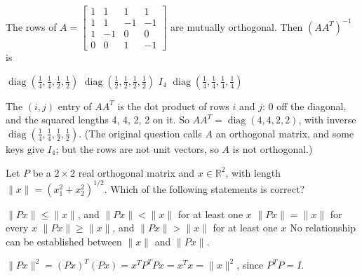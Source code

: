 \begin{question}[id=gate-ec2005-2, source=GATE EC 2005 (adapted), marks=2]
The rows of $A = \begin{bmatrix} 1 & 1 & 1 & 1 \\ 1 & 1 & -1 & -1 \\ 1 & -1 & 0 & 0 \\ 0 & 0 & 1 & -1 \end{bmatrix}$ are mutually orthogonal. Then $(AA^T)^{-1}$ is
\begin{options}
  \correct $\operatorname{diag}\left(\frac{1}{4}, \frac{1}{4}, \frac{1}{2}, \frac{1}{2}\right)$
  \option $\operatorname{diag}\left(\frac{1}{2}, \frac{1}{2}, \frac{1}{2}, \frac{1}{2}\right)$
  \option $I_4$
  \option $\operatorname{diag}\left(\frac{1}{4}, \frac{1}{4}, \frac{1}{4}, \frac{1}{4}\right)$
\end{options}
\begin{solution}
The $(i, j)$ entry of $AA^T$ is the dot product of rows $i$ and $j$: 0 off the diagonal, and the squared lengths 4, 4, 2, 2 on it. So $AA^T = \operatorname{diag}(4, 4, 2, 2)$, with inverse $\operatorname{diag}\left(\frac{1}{4}, \frac{1}{4}, \frac{1}{2}, \frac{1}{2}\right)$. (The original question calls $A$ an orthogonal matrix, and some keys give $I_4$; but the rows are not unit vectors, so $A$ is not orthogonal.)
\end{solution}
\end{question}

\begin{question}[id=gate-ee2008-2, source=GATE EE 2008]
Let $P$ be a $2 \times 2$ real orthogonal matrix and $x \in \mathbb{R}^2$, with length $\|x\| = (x_1^2 + x_2^2)^{1/2}$. Which of the following statements is correct?
\begin{options}
  \option $\|Px\| \le \|x\|$, and $\|Px\| < \|x\|$ for at least one $x$
  \correct $\|Px\| = \|x\|$ for every $x$
  \option $\|Px\| \ge \|x\|$, and $\|Px\| > \|x\|$ for at least one $x$
  \option No relationship can be established between $\|x\|$ and $\|Px\|$.
\end{options}
\begin{solution}
$\|Px\|^2 = (Px)^T(Px) = x^TP^TPx = x^Tx = \|x\|^2$, since $P^TP = I$.
\end{solution}
\end{question}

